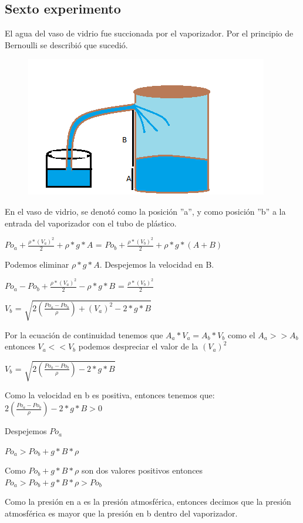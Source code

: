 \documentclass[10pt,a4paper]{article}
\begin{document}
\subsection*{Sexto experimento}
El agua del vaso de vidrio fue succionada por el vaporizador.
Por el principio de Bernoulli se describió que sucedió.
\begin{figure}[H]
\includegraphics[scale=0.65]{Vaporizacion.png}
\centering
\end{figure}
En el vaso de vidrio, se denotó como la posición ''a'', y como posición ''b'' a la entrada del vaporizador con el tubo de plástico.

$Po_{a}+\frac{\rho*(V_a)^2}{2}+\rho*g*A$ = $Po_{b}+\frac{\rho*(V_b)^2}{2}+\rho*g*(A+B)$

Podemos eliminar $\rho*g*A $. Despejemos la velocidad en B.

$Po_{a}-Po_{b}+\frac{\rho*(V_a)^2}{2}-\rho*g*B$ = $\frac{\rho*(V_b)^2}{2}$

$V_b$ = $\sqrt{2(\frac{Po_a-Po_b}{\rho})+(V_a)^2 -2*g*B}$

Por la ecuación de continuidad tenemos que $A_a*V_a=A_b*V_b$ como el $A_a>>A_b$ entonces $V_a<<V_b$ podemos despreciar el valor de la $(V_a)^2$

$V_b$ = $\sqrt{2(\frac{Po_a-Po_b}{\rho})-2*g*B}$

Como la velocidad en b es positiva, entonces tenemos que:
$2(\frac{Po_a-Po_b}{\rho})-2*g*B >0$

Despejemos $Po_a$

$Po_a>Po_b+g*B*\rho$

Como $Po_b+g*B*\rho$ son dos valores positivos entonces $Po_a>Po_b+g*B*\rho>Po_b$ 

Como la presión en a es la presión atmosférica, entonces decimos que la presión atmosférica es mayor que la presión en b dentro del vaporizador.
\end{document}

